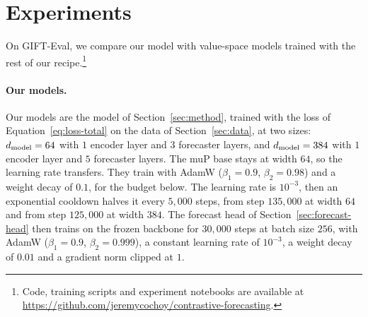 \section{Experiments}
\label{sec:experiments}

On GIFT-Eval, we compare our model with value-space models trained
with the rest of our recipe.\footnote{Code, training scripts
and experiment notebooks are available at
\url{https://github.com/jeremycochoy/contrastive-forecasting}.}


\paragraph{Our models.}
Our models are the model of Section~\ref{sec:method}, trained with the
loss of Equation~\eqref{eq:loss-total} on the data of
Section~\ref{sec:data}, at two sizes: $d_{\mathrm{model}} = 64$ with $1$ encoder
layer and $3$ forecaster layers, and $d_{\mathrm{model}} = 384$ with $1$ encoder
layer and $5$ forecaster layers. The muP base stays at width $64$, so
the learning rate transfers. They train with AdamW ($\beta_1 = 0.9$,
$\beta_2 = 0.98$) and a weight decay of $0.1$, for the budget below.
The learning rate is $10^{-3}$, then an exponential cooldown halves it
every $5{,}000$ steps, from step $135{,}000$ at width $64$ and from
step $125{,}000$ at width $384$. The forecast head of Section~\ref{sec:forecast-head} then trains
on the frozen backbone for $30{,}000$ steps at batch size $256$, with
AdamW ($\beta_1 = 0.9$, $\beta_2 = 0.999$), a constant learning rate of
$10^{-3}$, a weight decay of $0.01$ and a gradient norm clipped at $1$.

